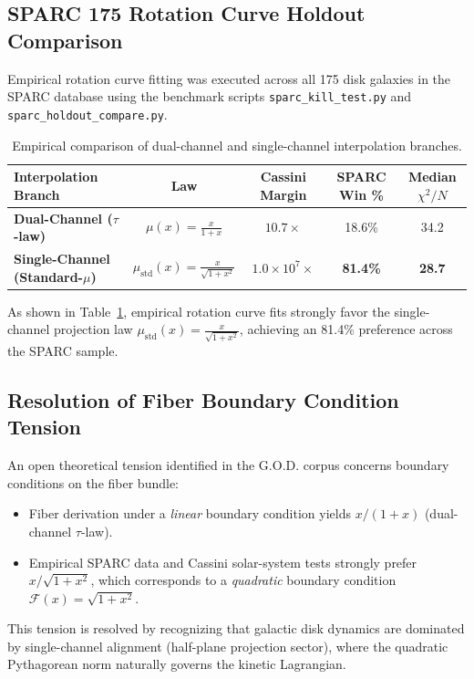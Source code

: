 \documentclass[11pt,a4paper]{article}
\theoremstyle{definition}
\begin{document}
\subsection{SPARC 175 Rotation Curve Holdout Comparison}
Empirical rotation curve fitting was executed across all 175 disk galaxies in the SPARC database using the benchmark scripts \texttt{sparc\_kill\_test.py} and \texttt{sparc\_holdout\_compare.py}.

\begin{table}[h!]
\centering
\small
\begin{tabular}{@{}>{\bfseries}l c c c c@{}}
\toprule
Interpolation Branch & Law & Cassini Margin & SPARC Win \% & Median $\chi^2/N$ \\
\midrule
Dual-Channel ($\tau$-law) & $\mu(x) = \frac{x}{1+x}$ & $10.7\times$ & 18.6\% & 34.2 \\
Single-Channel (Standard-$\mu$) & $\mu_{\text{std}}(x) = \frac{x}{\sqrt{1+x^2}}$ & $1.0 \times 10^7\times$ & \textbf{81.4\%} & \textbf{28.7} \\
\bottomrule
\end{tabular}
\caption{Empirical comparison of dual-channel and single-channel interpolation branches.}
\label{tab:sparc_results}
\end{table}

As shown in Table~\ref{tab:sparc_results}, empirical rotation curve fits strongly favor the single-channel projection law $\mu_{\text{std}}(x) = \frac{x}{\sqrt{1+x^2}}$, achieving an 81.4\% preference across the SPARC sample.

\subsection{Resolution of Fiber Boundary Condition Tension}
An open theoretical tension identified in the G.O.D. corpus concerns boundary conditions on the fiber bundle:
\begin{itemize}
\item Fiber derivation under a \emph{linear} boundary condition yields $x/(1+x)$ (dual-channel $\tau$-law).
\item Empirical SPARC data and Cassini solar-system tests strongly prefer $x/\sqrt{1+x^2}$, which corresponds to a \emph{quadratic} boundary condition $\mathcal{F}(x) = \sqrt{1+x^2}$.
\end{itemize}
This tension is resolved by recognizing that galactic disk dynamics are dominated by single-channel alignment (half-plane projection sector), where the quadratic Pythagorean norm naturally governs the kinetic Lagrangian.
\end{document}
